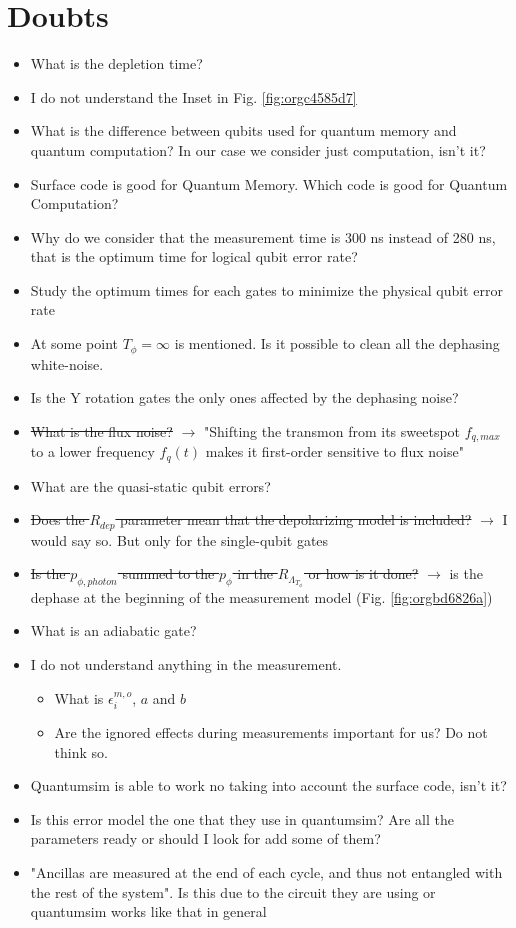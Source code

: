 \documentclass[11pt]{article}
\begin{document}
\section{Doubts}
\label{sec:org89eaff0}
\begin{itemize}
\item What is the depletion time?
\item I do not understand the Inset in Fig. \ref{fig:orgc4585d7}
\item What is the difference between qubits used for quantum memory and quantum computation? In our case we consider just computation, isn't it?
\item Surface code is good for Quantum Memory. Which code is good for Quantum Computation?
\item Why do we consider that the measurement time is 300 ns instead of 280 ns, that is the optimum time for logical qubit error rate?
\item Study the optimum times for each gates to minimize the physical qubit error rate
\item At some point \(T_{\phi} = \infty\) is mentioned. Is it possible to clean all the dephasing white-noise.
\item Is the Y rotation gates the only ones affected by the dephasing noise?
\item \sout{What is the flux noise?} \(\to\) "Shifting the transmon from its sweetspot \(f_{q,max}\) to a lower frequency \(f_q (t)\) makes it first-order sensitive to flux noise"
\item What are the quasi-static qubit errors?
\item \sout{Does the \(R_{dep}\) parameter mean that the depolarizing model is included?} \(\to\) I would say so. But only for the single-qubit gates
\item \sout{Is the \(p_{\phi, photon}\) summed to the \(p_{\phi}\) in the \(R_{\Lambda_{T_{\phi}}}\) or how is it done?} \(\to\) is the dephase at the beginning of the measurement model (Fig. \ref{fig:orgbd6826a})
\item What is an adiabatic gate?
\item I do not understand anything in the measurement.
\begin{itemize}
\item What is \(\epsilon_i^{m,o}\), \(a\) and \(b\)
\item Are the ignored effects during measurements important for us? Do not think so.
\end{itemize}
\item Quantumsim is able to work no taking into account the surface code, isn't it?
\item Is this error model the one that they use in quantumsim? Are all the parameters ready or should I look for add some of them?
\item "Ancillas are measured at the end of each cycle, and thus not entangled with the rest of the system". Is this due to the circuit they are using or quantumsim works like that in general
\end{itemize}
\end{document}
